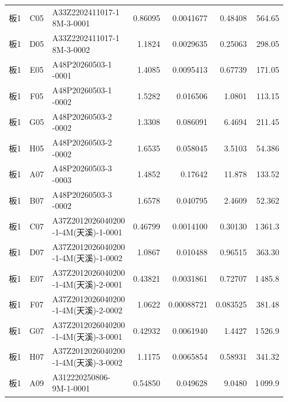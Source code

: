 \documentclass[UTF8,10pt,a4paper,fontset=fandol]{ctexart}
\begin{document}
\begin{tabular}{@{}c c p{3.55cm} r r r r@{}}
板1 & C05 & \shortstack[l]{A33Z2202411017-1\\8M-3-0001} & 0.86095 & 0.0041677 & 0.48408 & 564.65\\
板1 & D05 & \shortstack[l]{A33Z2202411017-1\\8M-3-0002} & 1.1824 & 0.0029635 & 0.25063 & 298.05\\
板1 & E05 & \shortstack[l]{A48P20260503-1\\-0001} & 1.4085 & 0.0095413 & 0.67739 & 171.05\\
板1 & F05 & \shortstack[l]{A48P20260503-1\\-0002} & 1.5282 & 0.016506 & 1.0801 & 113.15\\
板1 & G05 & \shortstack[l]{A48P20260503-2\\-0002} & 1.3308 & 0.086091 & 6.4694 & 211.45\\
板1 & H05 & \shortstack[l]{A48P20260503-2\\-0002} & 1.6535 & 0.058045 & 3.5103 & 54.386\\
板1 & A07 & \shortstack[l]{A48P20260503-3\\-0003} & 1.4852 & 0.17642 & 11.878 & 133.52\\
板1 & B07 & \shortstack[l]{A48P20260503-3\\-0002} & 1.6578 & 0.040795 & 2.4609 & 52.362\\
板1 & C07 & \shortstack[l]{A37Z2012026040200\\-1-4M(天溪)-1-0001} & 0.46799 & 0.0014100 & 0.30130 & 1\,361.3\\
板1 & D07 & \shortstack[l]{A37Z2012026040200\\-1-4M(天溪)-1-0002} & 1.0867 & 0.010488 & 0.96515 & 363.30\\
板1 & E07 & \shortstack[l]{A37Z2012026040200\\-1-4M(天溪)-2-0001} & 0.43821 & 0.0031861 & 0.72707 & 1\,485.8\\
板1 & F07 & \shortstack[l]{A37Z2012026040200\\-1-4M(天溪)-2-0002} & 1.0622 & 0.00088721 & 0.083525 & 381.48\\
板1 & G07 & \shortstack[l]{A37Z2012026040200\\-1-4M(天溪)-3-0001} & 0.42932 & 0.0061940 & 1.4427 & 1\,526.9\\
板1 & H07 & \shortstack[l]{A37Z2012026040200\\-1-4M(天溪)-3-0002} & 1.1175 & 0.0065854 & 0.58931 & 341.32\\
板1 & A09 & \shortstack[l]{A312220250806-\\9M-1-0001} & 0.54850 & 0.049628 & 9.0480 & 1\,099.9\\

\end{tabular}
\end{document}
